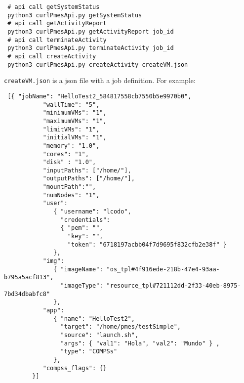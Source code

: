 \documentclass[a4paper,10pt]{article}
\begin{document}
\begin{verbatim}
 # api call getSystemStatus
 python3 curlPmesApi.py getSystemStatus
 # api call getActivityReport
 python3 curlPmesApi.py getActivityReport job_id
 # api call terminateActivity
 python3 curlPmesApi.py terminateActivity job_id
 # api call createActivity
 python3 curlPmesApi.py createActivity createVM.json
\end{verbatim}

\texttt{createVM.json} is a json file with a job definition. For example:
\begin{verbatim}
 [{ "jobName": "HelloTest2_584817558cb7550b5e9970b0",
           "wallTime": "5",
           "minimumVMs": "1",
           "maximumVMs": "1",
           "limitVMs": "1",
           "initialVMs": "1",
           "memory": "1.0",
           "cores": "1",
           "disk" : "1.0",
           "inputPaths": ["/home/"],
           "outputPaths": ["/home/"],
           "mountPath":"",
           "numNodes": "1",
           "user":
              { "username": "lcodo",
                "credentials":
                { "pem": "",
                  "key": "",
                  "token": "6718197acbb04f7d9695f832cfb2e38f" }
              },
           "img": 
              { "imageName": "os_tpl#4f916ede-218b-47e4-93aa-b795a5acf813", 
                "imageType": "resource_tpl#721112dd-2f33-40eb-8975-7bd34dbabfc8"
              },
           "app":
              { "name": "HelloTest2",
                "target": "/home/pmes/testSimple",
                "source": "launch.sh",
                "args": { "val1": "Hola", "val2": "Mundo" } ,
                "type": "COMPSs"
              },
           "compss_flags": {}
        }]
\end{verbatim}
\end{document}

